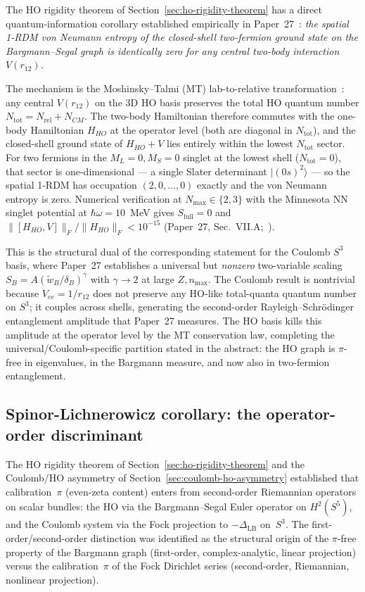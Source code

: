 \documentclass[twocolumn,pra,amsmath,amssymb,superscriptaddress]{revtex4-2}
\begin{document}
The HO rigidity theorem of
Section~\ref{sec:ho-rigidity-theorem} has a direct
quantum-information corollary established empirically in
Paper~27~\cite{paper27_entropy}: \emph{the spatial 1-RDM
von Neumann entropy of the closed-shell two-fermion ground
state on the Bargmann--Segal graph is identically zero for
any central two-body interaction $V(r_{12})$.}

The mechanism is the Moshinsky--Talmi (MT) lab-to-relative
transformation~\cite{moshinsky_smirnov_1996}: any central
$V(r_{12})$ on the 3D HO basis preserves the total HO quantum
number $N_{\mathrm{tot}} = N_{\mathrm{rel}} + N_{CM}$.  The
two-body Hamiltonian therefore commutes with the one-body
Hamiltonian $H_{HO}$ at the operator level (both are
diagonal in $N_{\mathrm{tot}}$), and the closed-shell ground
state of $H_{HO}+V$ lies entirely within the lowest
$N_{\mathrm{tot}}$ sector.  For two fermions in the
$M_L=0, M_S=0$ singlet at the lowest shell ($N_{\mathrm{tot}}=0$),
that sector is one-dimensional --- a single Slater determinant
$|(0s)^{2}\rangle$ --- so the spatial 1-RDM has occupation
$(2,0,\ldots,0)$ exactly and the von Neumann entropy is zero.
Numerical verification at $N_{\max}\in\{2,3\}$ with the
Minnesota NN singlet potential at $\hbar\omega = 10$~MeV gives
$S_{\mathrm{full}}=0$ and $\lVert[H_{HO},V]\rVert_F /
\lVert H_{HO}\rVert_F < 10^{-15}$ (Paper~27,
Sec.~VII.A;~\cite{paper27_entropy}).

This is the structural dual of the corresponding statement
for the Coulomb $S^3$ basis, where Paper~27 establishes a
universal but \emph{nonzero} two-variable scaling
$S_B = A(\tilde{w}_B/\delta_B)^{\gamma}$ with
$\gamma\to 2$ at large $Z, n_{\max}$.  The Coulomb result is
nontrivial because $V_{ee} = 1/r_{12}$ does not preserve any
HO-like total-quanta quantum number on $S^3$; it couples
across shells, generating the second-order
Rayleigh--Schr\"odinger entanglement amplitude that
Paper~27 measures.  The HO basis kills this amplitude at
the operator level by the MT conservation law, completing
the universal/Coulomb-specific partition stated in the
abstract: the HO graph is $\pi$-free in eigenvalues, in the
Bargmann measure, and now also in two-fermion entanglement.

\subsection{Spinor-Lichnerowicz corollary: the operator-order discriminant}
\label{sec:spinor-lichnerowicz}

The HO rigidity theorem of Section~\ref{sec:ho-rigidity-theorem}
and the Coulomb/HO asymmetry of Section~\ref{sec:coulomb-ho-asymmetry}
established that calibration~$\pi$ (even-zeta content) enters from
second-order Riemannian operators on scalar bundles: the HO via
the Bargmann--Segal Euler operator on $H^2(S^5)$, and the Coulomb
system via the Fock projection to $-\Delta_{\mathrm{LB}}$ on~$S^3$.
The first-order/second-order distinction was identified as the
structural origin of the $\pi$-free property of the Bargmann graph
(first-order, complex-analytic, linear projection) versus the
calibration~$\pi$ of the Fock Dirichlet series (second-order,
Riemannian, nonlinear projection).
\end{document}
